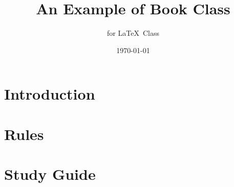 \documentclass[11pt]{report}              %
\title{\bf An Example of Book Class}    %
\author{for \LaTeX\ Class}              %
\date{\today}                           %
\begin{document}
\maketitle                              %
\tableofcontents                        %
\part{Introduction}                   %

\part{Rules}

\part{Study Guide}

\begin{appendices}
\end{appendices}
\printglossary
\end{document}
